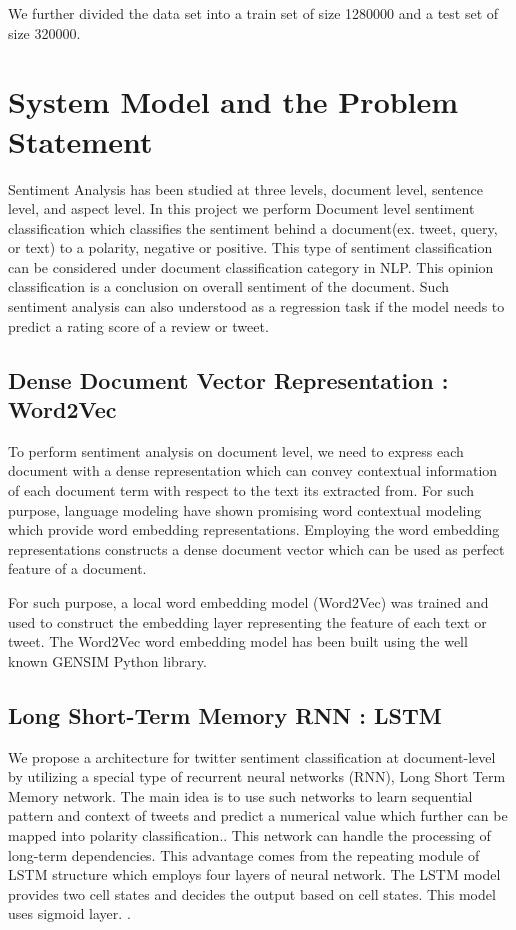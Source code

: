 \documentclass[journal]{IEEEtran}
\begin{document}
We further divided the data set into a train set of size 1280000 and a test set of size 320000.


\section{System Model and the Problem Statement}
\label{sysmo}
Sentiment Analysis has been studied at three levels, document level, sentence level, and aspect level\cite{Yang}. In this project we perform Document level sentiment classification which classifies the sentiment behind a document(ex. tweet, query, or text) to a polarity, negative or positive. This type of sentiment classification can be considered under document classification category in NLP. This opinion classification is a conclusion on overall sentiment of the document. Such sentiment analysis can also understood as a regression task if the model needs to predict a rating score of a review or tweet.

\subsection{ Dense Document Vector Representation : Word2Vec}
To perform sentiment analysis on document level, we need to express each document with a dense representation which can convey contextual information of each document term with respect to the text its extracted from. For such purpose, language modeling have shown promising word contextual modeling which provide word embedding representations. Employing the word embedding representations constructs a dense document vector which can be used as perfect feature of a document.

\mdskip
For such purpose, a local word embedding model (Word2Vec) was trained and used to construct the embedding layer representing the feature of each text or tweet. The Word2Vec word embedding model has been built using the well known GENSIM Python library.

\subsection{ Long Short-Term Memory RNN : LSTM}
We propose a architecture for twitter sentiment classification at document-level by utilizing a special type of recurrent neural networks (RNN),  Long Short Term Memory network. The main idea is to use such networks to learn sequential pattern and context of tweets and predict a numerical value which further can be mapped into polarity classification.. This network can handle the processing of long-term dependencies. This advantage comes from  the repeating module of LSTM structure which employs four layers of neural network. The LSTM model provides two cell states and decides the output based on cell states. This model uses sigmoid layer. \cite{Yang}.
\end{document}

